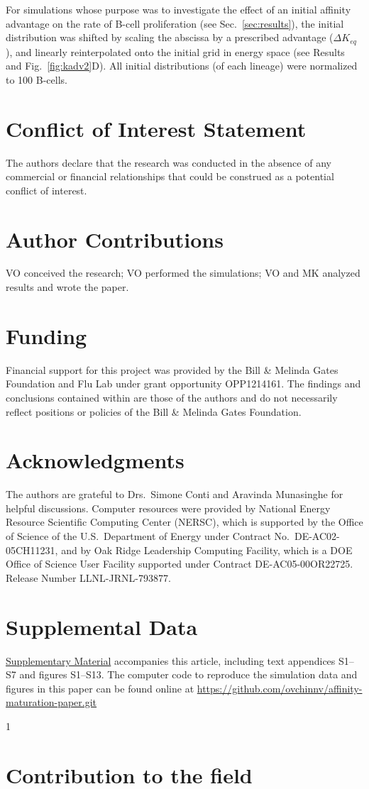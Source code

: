 \documentclass[utf8]{frontiersHLTH}%
\def\significance{1}
\newcommand{\mk}[1]{} %
\newcommand{\fig}[1]{Fig.~\ref{fig:#1}}
\newcommand{\Sec}[1]{Sec.~\ref{sec:#1}}
\renewcommand{\sec}[1]{\Sec{#1}}
\begin{document}
For simulations whose purpose was to investigate the
effect of an initial affinity advantage on the rate of B-cell
proliferation (see \sec{results}), the initial distribution was shifted by scaling the
abscissa by a prescribed advantage ($\Delta K_{eq}$), {\mk{[kappa should be
superscript]}} and linearly
reinterpolated onto the initial grid in energy space (see Results and \fig{kadv2}D). All
initial distributions (of each lineage) were normalized to 100 B-cells.


\section*{Conflict of Interest Statement}
The authors declare that the research was conducted in the absence of any
commercial or financial relationships that could be construed as a
potential conflict of interest.
%
\section*{Author Contributions}
VO conceived the research;
VO performed the simulations;
VO and MK analyzed results and wrote the paper.
%
\section*{Funding}
Financial support for this project was provided by the Bill \& Melinda
Gates Foundation and Flu Lab under grant opportunity OPP1214161. The
findings and conclusions contained within are those of the authors and do
not necessarily reflect positions or policies of the Bill \& Melinda Gates
Foundation.
\section*{Acknowledgments}
The authors are grateful to Drs.~Simone Conti and Aravinda Munasinghe
for helpful discussions.
Computer resources were provided by National Energy Resource Scientific
Computing Center (NERSC), which is supported by the Office of Science of
the U.S.~Department of Energy under Contract No.~DE-AC02-05CH11231, and
by Oak Ridge Leadership Computing Facility, which is a DOE Office of
Science User Facility supported under Contract DE-AC05-00OR22725. Release
Number LLNL-JRNL-793877.

\section*{Supplemental Data}
\href{http://home.frontiersin.org/about/author-guidelines#SupplementaryMaterial}{Supplementary Material}
accompanies this article, including text appendices S1--S7 and figures S1--S13.
The computer code to reproduce the simulation data and figures in this paper can be found online at \url{https://github.com/ovchinnv/affinity-maturation-paper.git}




\clearpage
\ifx\significance\undefined
\else
\if\significance1
\section*{Contribution to the field}
\noindent

\fi
\fi
%
\end{document}
